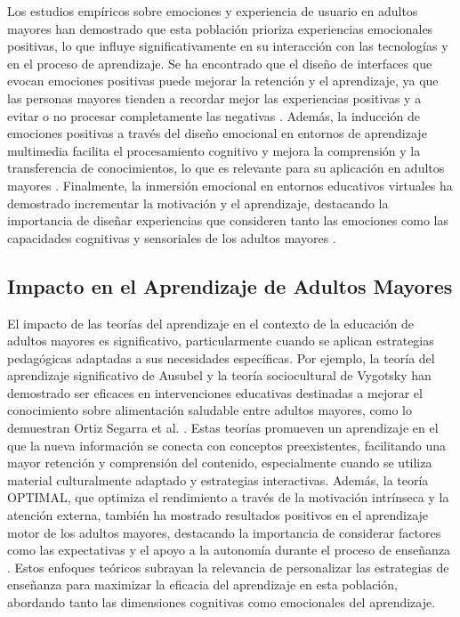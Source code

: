 Los estudios empíricos sobre emociones y experiencia de usuario en adultos mayores han demostrado que esta población prioriza experiencias emocionales positivas, lo que influye significativamente en su interacción con las tecnologías y en el proceso de aprendizaje. Se ha encontrado que el diseño de interfaces que evocan emociones positivas puede mejorar la retención y el aprendizaje, ya que las personas mayores tienden a recordar mejor las experiencias positivas y a evitar o no procesar completamente las negativas \cite{kremer_studying_2016}. Además, la inducción de emociones positivas a través del diseño emocional en entornos de aprendizaje multimedia facilita el procesamiento cognitivo y mejora la comprensión y la transferencia de conocimientos, lo que es relevante para su aplicación en adultos mayores \cite{um_emotional_2012}. Finalmente, la inmersión emocional en entornos educativos virtuales ha demostrado incrementar la motivación y el aprendizaje, destacando la importancia de diseñar experiencias que consideren tanto las emociones como las capacidades cognitivas y sensoriales de los adultos mayores \cite{lie_developing_2023}.


\subsection{Impacto en el Aprendizaje de Adultos Mayores}

El impacto de las teorías del aprendizaje en el contexto de la educación de adultos mayores es significativo, particularmente cuando se aplican estrategias pedagógicas adaptadas a sus necesidades específicas. Por ejemplo, la teoría del aprendizaje significativo de Ausubel y la teoría sociocultural de Vygotsky han demostrado ser eficaces en intervenciones educativas destinadas a mejorar el conocimiento sobre alimentación saludable entre adultos mayores, como lo demuestran Ortiz Segarra et al. \citeyear{ortiz_segarra_impact_2023}. Estas teorías promueven un aprendizaje en el que la nueva información se conecta con conceptos preexistentes, facilitando una mayor retención y comprensión del contenido, especialmente cuando se utiliza material culturalmente adaptado y estrategias interactivas. Además, la teoría OPTIMAL, que optimiza el rendimiento a través de la motivación intrínseca y la atención externa, también ha mostrado resultados positivos en el aprendizaje motor de los adultos mayores, destacando la importancia de considerar factores como las expectativas y el apoyo a la autonomía durante el proceso de enseñanza \cite{khalaji_optimizing_2024}. Estos enfoques teóricos subrayan la relevancia de personalizar las estrategias de enseñanza para maximizar la eficacia del aprendizaje en esta población, abordando tanto las dimensiones cognitivas como emocionales del aprendizaje.
   
